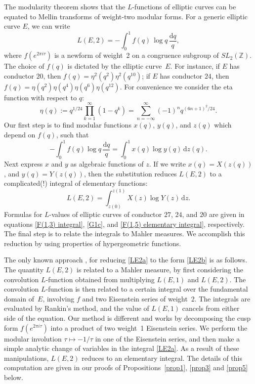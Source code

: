\documentclass[12pt,reqno]{amsart}
\theoremstyle{remark}
\begin{document}
The modularity theorem shows that
the $L$-functions of elliptic curves can be equated to Mellin
transforms of weight-two modular forms. For a generic elliptic
curve $E$, we can write
\begin{equation}
L(E,2)=-\int_{0}^{1}f(q)\,\log q\,\frac{{{\mathrm d}} q}{q},
\label{LE2a}
\end{equation}
where $f(e^{2\pi i \tau})$ is a newform of weight~2 on a congruence
subgroup of $SL_2(\mathbb{Z})$.  The choice of $f(q)$ is dictated by
the elliptic curve~$E$.  For instance, if $E$ has conductor $20$,
then $f(q)=\eta^2(q^2)\eta^2(q^{10})$; if $E$ has conductor $24$,
then $f(q)=\eta(q^2)\eta(q^4)\eta(q^6)\eta(q^{12})$. For convenience
we consider the eta function with respect to $q$:
\begin{equation*}
\eta(q):=q^{1/24}\prod_{k=1}^{\infty}(1-q^{k})
=\sum_{n=-\infty}^{\infty}(-1)^nq^{(6n+1)^2/24}.
\end{equation*}
Our first step is to find modular functions $x(q)$, $y(q)$, and
$z(q)$ which depend on $f(q)$, such that
\begin{equation}
-\int_{0}^{1}f(q)\log q \,\frac{{{\mathrm d}} q}{q}
=\int_{0}^{1}x(q)\log y(q)\,{{\mathrm d}} z(q).
\label{LE2b}
\end{equation}
Next express $x$ and $y$ as algebraic functions of $z$. If we
write $x(q)=X(z(q))$, and $y(q)=Y(z(q))$, then the substitution
reduces $L(E,2)$ to a complicated(!) integral of elementary
functions:
\begin{equation*}
L(E,2)=\int_{z(0)}^{z(1)}X(z)\log Y(z)\,{{\mathrm d}} z.
\end{equation*}
Formulas for $L$-values of elliptic curves of conductor $27$,
$24$, and $20$ are given in equations \eqref{F(1,3) integral},
\eqref{G1c}, and \eqref{F(1,5) elementary integral}, respectively. The final
step is to relate the integrals to Mahler measures. We accomplish
this reduction by using properties of hypergeometric functions.

The only known approach \cite{Br}, \cite{Me} for reducing \eqref{LE2a}
to the form \eqref{LE2b} is as follows.
The quantity $L(E,2)$ is related to a Mahler measure, by first considering the
convolution $L$-function obtained from multiplying $L(E,1)$ and
$L(E,2)$.  The convolution $L$-function is then related to a
certain integral over the fundamental domain of~$E$, involving $f$
and two Eisenstein series of weight~2.  The integrals are
evaluated by Rankin's method, and the value of $L(E,1)$ cancels
from either side of the equation. Our method  is different and
works by decomposing the cusp form $f(e^{2\pi i\tau})$ into a
product of two weight~1 Eisenstein series.   We perform the
modular involution $\tau\mapsto-1/\tau$ in one of the Eisenstein
series, and then make a simple analytic change of variables in the
integral \eqref{LE2a}. As a result of these manipulations,
$L(E,2)$ reduces to an elementary integral. The details of this
computation are given in our proofs of Propositions~\ref{prop1},
\ref{prop3} and \ref{prop5} below.
\end{document}

